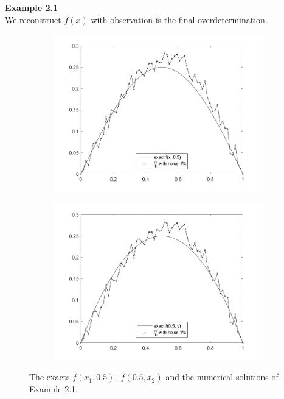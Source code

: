 \documentclass[]{article}
\begin{document}
\noindent\textbf{Example 2.1}
\\
We reconstruct $f(x)$ with observation is the final overdetermination.
\begin{figure}[h!]
	\begin{subfigure}{.5\linewidth}
		\centering
		\includegraphics[width=\linewidth]{../Csharp/Results/HS_QT_fx1}
	\end{subfigure}%
	\begin{subfigure}{.5\linewidth}
		\centering
		\includegraphics[width=\linewidth]{../Csharp/Results/HS_QT_fx2}
	\end{subfigure}
	\caption{The exacts $f(x_1, 0.5),\; f(0.5, x_2)$ and the numerical solutions of Example 2.1.}
\end{figure}
\end{document}
